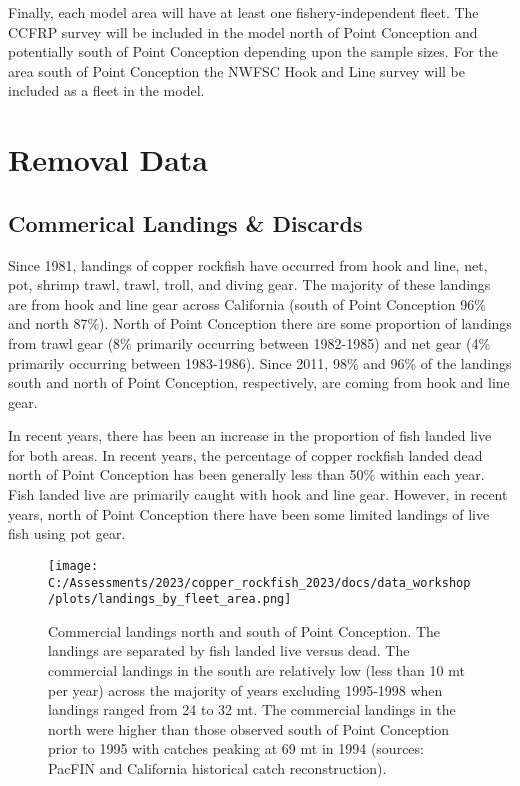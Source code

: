 \documentclass[
]{article}
\begin{document}
Finally, each model area will have at least one fishery-independent
fleet. The CCFRP survey will be included in the model north of Point
Conception and potentially south of Point Conception depending upon the
sample sizes. For the area south of Point Conception the NWFSC Hook and
Line survey will be included as a fleet in the model.

\hypertarget{removal-data}{%
\section{Removal Data}\label{removal-data}}

\hypertarget{commerical-landings-discards}{%
\subsection{Commerical Landings \&
Discards}\label{commerical-landings-discards}}

Since 1981, landings of copper rockfish have occurred from hook and
line, net, pot, shrimp trawl, trawl, troll, and diving gear. The
majority of these landings are from hook and line gear across California
(south of Point Conception 96\% and north 87\%). North of Point
Conception there are some proportion of landings from trawl gear (8\%
primarily occurring between 1982-1985) and net gear (4\% primarily
occurring between 1983-1986). Since 2011, 98\% and 96\% of the landings
south and north of Point Conception, respectively, are coming from hook
and line gear.

In recent years, there has been an increase in the proportion of fish
landed live for both areas. In recent years, the percentage of copper
rockfish landed dead north of Point Conception has been generally less
than 50\% within each year. Fish landed live are primarily caught with
hook and line gear. However, in recent years, north of Point Conception
there have been some limited landings of live fish using pot gear.

\begin{figure}
\centering
\texttt{[image: C:/Assessments/2023/copper\_rockfish\_2023/docs/data\_workshop/plots/landings\_by\_fleet\_area.png]}
\caption{Commercial landings north and south of Point Conception. The
landings are separated by fish landed live versus dead. The commercial
landings in the south are relatively low (less than 10 mt per year)
across the majority of years excluding 1995-1998 when landings ranged
from 24 to 32 mt. The commercial landings in the north were higher than
those observed south of Point Conception prior to 1995 with catches
peaking at 69 mt in 1994 (sources: PacFIN and California historical
catch reconstruction).\label{fig:com-landings}}
\end{figure}
\end{document}
